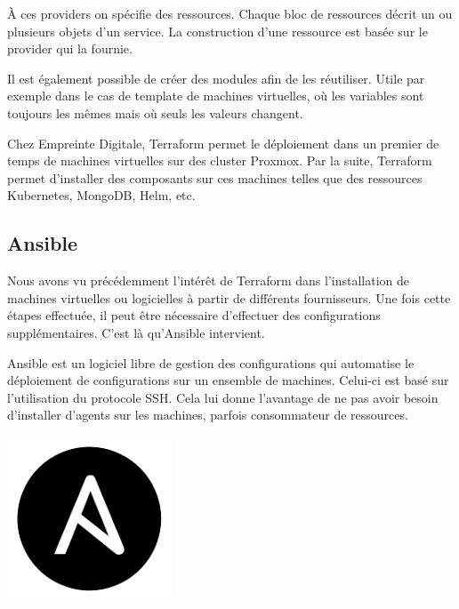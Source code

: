 \documentclass[12pt]{article}
\begin{document}
À ces providers on spécifie des ressources. 
Chaque bloc de ressources décrit un ou plusieurs objets d'un service. 
La construction d'une ressource est basée sur le provider qui la fournie.

Il est également possible de créer des modules afin de les réutiliser. 
Utile par exemple dans le cas de template de machines virtuelles, où les variables sont toujours les mêmes mais où seuls les valeurs changent.

Chez Empreinte Digitale, Terraform permet le déploiement dans un premier de temps de machines virtuelles sur des \gls{cluster} \gls{Proxmox}. 
Par la suite, Terraform permet d'installer des composants sur ces machines telles que des ressources Kubernetes, MongoDB, Helm, etc.

\newpage
\subsection{\gls{Ansible}}
Nous avons vu précédemment l'intérêt de Terraform dans l'installation de machines virtuelles ou logicielles à partir de différents fournisseurs. 
Une fois cette étapes effectuée, il peut être nécessaire d'effectuer des configurations supplémentaires. 
C'est là qu'\gls{Ansible} intervient.

\noindent%
\begin{minipage}{.8\textwidth}%
\gls{Ansible} est un logiciel libre de gestion des configurations qui automatise le déploiement de configurations sur un ensemble de machines. 
Celui-ci est basé sur l'utilisation du protocole SSH. 
Cela lui donne l'avantage de ne pas avoir besoin d'installer d'agents sur les machines, parfois consommateur de ressources.

\end{minipage}%
\hfill
\begin{minipage}{.2\textwidth}%
\begin{center}
\includegraphics[scale=0.3]{src/logo_ansible.png}
\end{center}
\end{minipage}%
\end{document}
